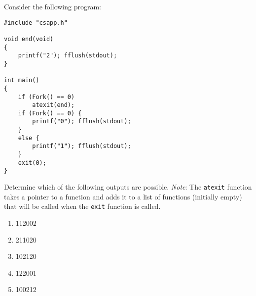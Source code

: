 \documentclass[12pt]{article}
\newenvironment{ex}[2][Exercise]{\begin{trivlist}
		\item[\hskip \labelsep {\bfseries #1}\hskip \labelsep {\bfseries #2.}]}{\end{trivlist}}
\begin{document}
\begin{ex}{8.18}
	Consider the following program:
	\begin{lstlisting}
#include "csapp.h"

void end(void)
{
	printf("2"); fflush(stdout);
}

int main()
{
	if (Fork() == 0)
		atexit(end);
	if (Fork() == 0) {
		printf("0"); fflush(stdout);
	}
	else {
		printf("1"); fflush(stdout);
	}
	exit(0);
}
	\end{lstlisting}
	Determine which of the following outputs are possible. \emph{Note}: The \texttt{atexit} function
	takes a pointer to a function and adds it to a list of functions (initially empty) that will be
	called when the \texttt{exit} function is called.
	\begin{enumerate}[label=(\alph*)]
		\item 112002
		\item 211020
		\item 102120
		\item 122001
		\item 100212
	\end{enumerate}
\end{ex}
\end{document}
